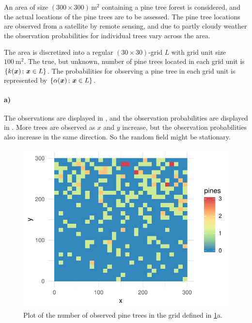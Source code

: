 \section{}
\label{sec:problem2}

An area of size $(300 \times 300) \, \si{\meter^2}$ containing a pine tree forest is considered, and the actual locations of the pine trees are to be assessed. The pine tree locations are observed from a satellite by remote sensing, and due to partly cloudy weather the observation probabilities for individual trees vary across the area.

The area is discretized into a regular $(30 \times 30)$-grid $L$ with grid unit size $\SI{100}{\meter^2}$. The true, but unknown, number of pine trees located in each grid unit is \newline $\{k(\bm{x}) \,;\, \bm{x} \in L\}$. The probabilities for observing a pine tree in each grid unit is represented by $\{\alpha(\bm{x}) \,;\, \bm{x} \in L\}$. 

\paragraph{a)}
The observations are displayed in , and the observation probabilities are displayed in . More trees are observed as $x$ and $y$ increase, but the observation probabilities also increase in the same direction. So the random field might be stationary.

\begin{figure}
    \centering
    \includegraphics{figures/p2_pines.pdf}
    \caption{Plot of the number of observed pine trees in the grid defined in \ref{sec:problem2}a.}
    \label{fig:p2_pines}
\end{figure}

